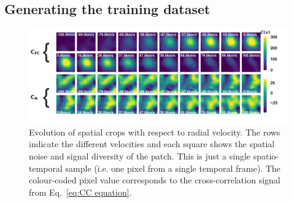 \documentclass{aa}
\begin{document}
\subsection{Generating the training dataset}

\begin{figure}[t]
    \includegraphics[width=\textwidth]{fig_2_dec2023_aligned_cropped.png}
    \caption{
    Evolution of spatial crops with respect to radial velocity. The rows indicate the different velocities and each square shows the spatial noise and signal diversity of the patch. 
    This is just a single spatio-temporal sample (i.e. one pixel from a single temporal frame).
    The colour-coded pixel value corresponds to the cross-correlation signal from Eq.~\ref{eq:CC equation}. 
    }
    \label{fig:fig-2}
\end{figure}
\end{document}
